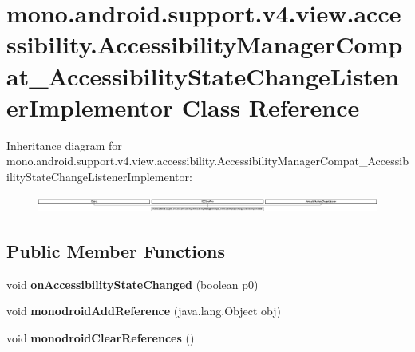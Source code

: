 \hypertarget{classmono_1_1android_1_1support_1_1v4_1_1view_1_1accessibility_1_1_accessibility_manager_compat_18265d54b1862e339153b0dd9ae68d99}{}\section{mono.\+android.\+support.\+v4.\+view.\+accessibility.\+Accessibility\+Manager\+Compat\+\_\+\+Accessibility\+State\+Change\+Listener\+Implementor Class Reference}
\label{classmono_1_1android_1_1support_1_1v4_1_1view_1_1accessibility_1_1_accessibility_manager_compat_18265d54b1862e339153b0dd9ae68d99}
Inheritance diagram for mono.\+android.\+support.\+v4.\+view.\+accessibility.\+Accessibility\+Manager\+Compat\+\_\+\+Accessibility\+State\+Change\+Listener\+Implementor\+:\begin{figure}[H]
\begin{center}
\leavevmode
\includegraphics[height=0.537944cm]{classmono_1_1android_1_1support_1_1v4_1_1view_1_1accessibility_1_1_accessibility_manager_compat_18265d54b1862e339153b0dd9ae68d99}
\end{center}
\end{figure}
\subsection*{Public Member Functions}
\begin{DoxyCompactItemize}
\item 
\mbox{\label{classmono_1_1android_1_1support_1_1v4_1_1view_1_1accessibility_1_1_accessibility_manager_compat_18265d54b1862e339153b0dd9ae68d99_acdf8570d96d322e71494739706e3af96}} 
void {\bfseries on\+Accessibility\+State\+Changed} (boolean p0)
\item 
\mbox{\label{classmono_1_1android_1_1support_1_1v4_1_1view_1_1accessibility_1_1_accessibility_manager_compat_18265d54b1862e339153b0dd9ae68d99_a5616ac43fada2020fb225da3e2755d8e}} 
void {\bfseries monodroid\+Add\+Reference} (java.\+lang.\+Object obj)
\item 
\mbox{\label{classmono_1_1android_1_1support_1_1v4_1_1view_1_1accessibility_1_1_accessibility_manager_compat_18265d54b1862e339153b0dd9ae68d99_ae0bd329d8a6fcfcf3820b81f03775c17}} 
void {\bfseries monodroid\+Clear\+References} ()
\end{DoxyCompactItemize}
